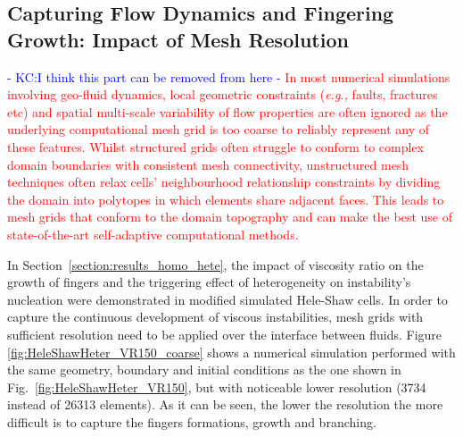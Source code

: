 \documentclass[preprint,authoryear,12pt]{elsarticle}
\newcommand{\red}{\textcolor{red}}
\newcommand{\blue}{\textcolor{blue}}
\newcommand{\eg}{{\it e.g., }}
\begin{document}
\subsection{Capturing Flow Dynamics and Fingering Growth: Impact of Mesh Resolution}\label{section:results_hete_fix_adapt}    

\blue{ - KC:I think this part can be removed from here - } 
\red{In most numerical simulations involving geo-fluid dynamics, local geometric constraints (\eg faults, fractures etc) and spatial multi-scale variability of flow properties are often ignored as the underlying computational mesh grid is too coarse to reliably represent any of these features. Whilst structured grids often struggle to conform to complex domain boundaries with consistent mesh connectivity, unstructured mesh techniques often relax cells' neighbourhood relationship constraints by dividing the domain into polytopes in which elements share adjacent faces. This leads to mesh grids that conform to the domain topography and can make the best use of state-of-the-art self-adaptive computational methods.}

\medskip
In Section~\ref{section:results_homo_hete}, the impact of viscosity ratio on the growth of fingers and the triggering effect of heterogeneity on instability's nucleation were demonstrated in modified simulated Hele-Shaw cells. In order to capture the continuous development of viscous instabilities, mesh grids with sufficient resolution need to be applied over the interface between fluids. Figure \ref{fig:HeleShawHeter_VR150_coarse} shows a numerical simulation performed with the same geometry, boundary and initial conditions as the one shown in Fig.~\ref{fig:HeleShawHeter_VR150}, but with noticeable lower resolution (3734 instead of 26313 elements). As it can be seen, the lower the resolution the more difficult is to capture the fingers formations, growth and branching.
\end{document}
